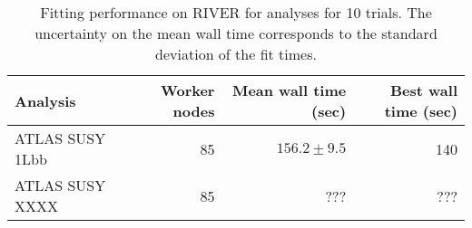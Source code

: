 \begin{table}[htpb]
\centering
\caption{Fitting performance on RIVER for analyses for 10 trials. The uncertainty on the mean wall time corresponds to the standard deviation of the fit times.}
\label{table:performance}
\begin{tabular}{@{}lrrr@{}}
\toprule
       Analysis & Worker nodes & Mean wall time (sec) & Best wall time (sec) \\
\midrule
ATLAS SUSY 1Lbb &           85 &        $156.2\pm9.5$ &                  140 \\
ATLAS SUSY XXXX &           85 &                  ??? &                  ??? \\
\bottomrule
\end{tabular}
\end{table}
